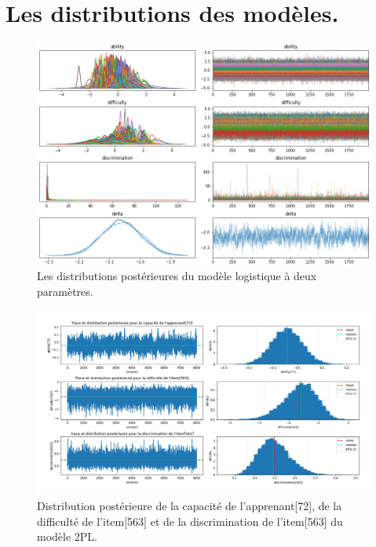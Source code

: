\chapter{Les distributions des modèles.}

\begin{figure}[H]
	\begin{center}
		\includegraphics[width=\textwidth]{images/annexe/model_plot-trace2.png}
	\end{center}
	\caption{Les distributions postérieures du modèle logistique à deux paramètres.}
	\label{model_trace-plot2}
\end{figure}

\begin{figure}[H]
	\begin{center}
		\includegraphics[width=\textwidth]{images/annexe/params_posterior_distribution2.png}
	\end{center}
	\caption{Distribution postérieure de la capacité de l’apprenant[72], de la difficulté de l’item[563] et de la discrimination de l’item[563] du modèle 2PL.}
	\label{params_posterior_distribution_2pl}
\end{figure}

